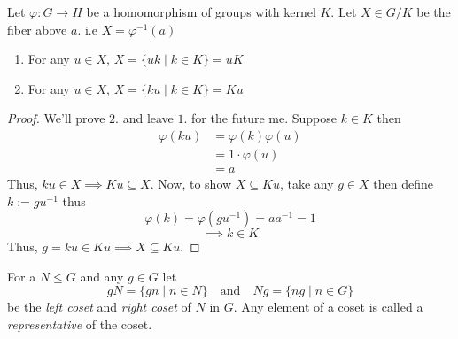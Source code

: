 \begin{proposition}
    Let $\varphi : G \to H$ be a homomorphism of groups with kernel $K$. Let $X \in G/K$ be the fiber above $a$. i.e 
    $X = \varphi^{-1}(a)$
    \begin{enumerate}
        \item For any $u \in X$, $X = \{u k \mid k \in K\} = uK$
        \item For any $u \in X$, $X=\{ku \mid k \in K\} = Ku$
    \end{enumerate}
\end{proposition}

\begin{proof}
    We'll prove $2.$ and leave $1.$ for the future me. Suppose $k \in K$ then 
    \begin{align*}
        \varphi(ku) &= \varphi(k) \varphi(u) \\
        &= 1 \cdot \varphi(u) \\
        &= a
    \end{align*}
    Thus, $ku \in X \implies Ku \subseteq X$. Now, to show $X \subseteq Ku$, take any $g \in X$ then define $k := gu^{-1}$ thus
    \[ \varphi(k)=\varphi(gu^{-1})=a a^{-1}=1 \]
    \[ \implies k \in K \]
    Thus, $g=ku \in Ku \implies X \subseteq Ku$. 
\end{proof}


\begin{definition}
    For a $N \le G$ and any $g \in G$ let 
    \[ gN = \{ gn \mid n \in N\} \quad \text{and} \quad Ng = \{ ng \mid n \in G\} \]
    be the \textit{left coset} and \textit{right coset} of $N$ in $G$. Any element of a coset is called a \textit{representative} of the 
    coset.
\end{definition}